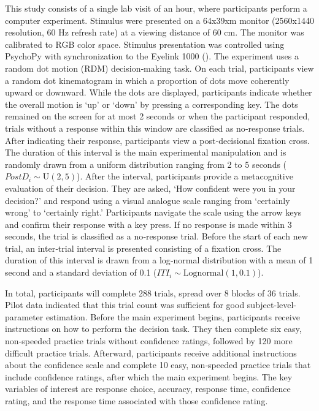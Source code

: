 \documentclass[
]{article}
\begin{document}
This study consists of a single lab visit of an hour, where participants
perform a computer experiment. Stimulus were presented on a 64x39xm
monitor (2560x1440 resolution, 60 Hz refresh rate) at a viewing distance
of 60 cm. The monitor was calibrated to RGB color space. Stimulus
presentation was controlled using PsychoPy with synchronization to the
Eyelink 1000
(). The experiment uses a random dot motion (RDM)
decision‑making task. On each trial, participants view a random dot
kinematogram in which a proportion of dots move coherently upward or
downward. While the dots are displayed, participants indicate whether
the overall motion is `up' or `down' by pressing a corresponding key.
The dots remained on the screen for at most 2 seconds or when the
participant responded, trials without a response within this window are
classified as no‑response trials. After indicating their response,
participants view a post‑decisional fixation cross. The duration of this
interval is the main experimental manipulation and is randomly drawn
from a uniform distribution ranging from 2 to 5 seconds
(\(PostD_i \sim \text{U}(2, 5)\)). After the interval, participants
provide a metacognitive evaluation of their decision. They are asked,
`How confident were you in your decision?' and respond using a visual
analogue scale ranging from `certainly wrong' to `certainly right.'
Participants navigate the scale using the arrow keys and confirm their
response with a key press. If no response is made within 3 seconds, the
trial is classified as a no‑response trial. Before the start of each new
trial, an inter‑trial interval is presented consisting of a fixation
cross. The duration of this interval is drawn from a log‑normal
distribution with a mean of 1 second and a standard deviation of 0.1
(\(ITI_i \sim \text{Lognormal}(1,0.1)\)).

In total, participants will complete 288 trials, spread over 8 blocks of
36 trials. Pilot data indicated that this trial count was sufficient for
good subject-level-parameter estimation. Before the main experiment
begins, participants receive instructions on how to perform the decision
task. They then complete six easy, non‑speeded practice trials without
confidence ratings, followed by 120 more difficult practice trials.
Afterward, participants receive additional instructions about the
confidence scale and complete 10 easy, non‑speeded practice trials that
include confidence ratings, after which the main experiment begins. The
key variables of interest are response choice, accuracy, response time,
confidence rating, and the response time associated with those
confidence rating.
\end{document}
